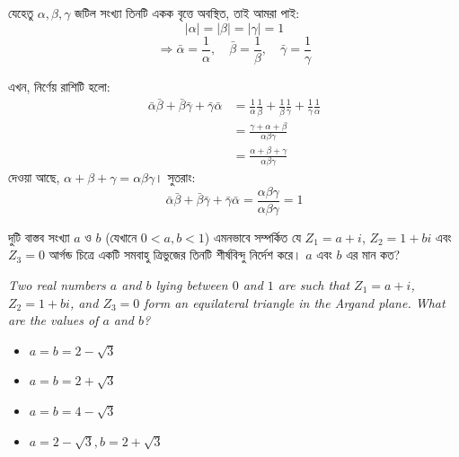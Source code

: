 \documentclass[12pt, a4paper]{article}
\begin{document}
\begin{tcolorbox}[solutionbox={সমাধান (Solution)}]
    \noindent
    যেহেতু $\alpha, \beta, \gamma$ জটিল সংখ্যা তিনটি একক বৃত্তে অবস্থিত, তাই আমরা পাই:
    \[ |\alpha| = |\beta| = |\gamma| = 1 \]
    \[ \Rightarrow \bar{\alpha} = \frac{1}{\alpha}, \quad \bar{\beta} = \frac{1}{\beta}, \quad \bar{\gamma} = \frac{1}{\gamma} \]
    
    \vspace{0.5em}
    এখন, নির্ণেয় রাশিটি হলো:
    \begin{align*}
        \bar{\alpha}\bar{\beta} + \bar{\beta}\bar{\gamma} + \bar{\gamma}\bar{\alpha} &= \frac{1}{\alpha}\frac{1}{\beta} + \frac{1}{\beta}\frac{1}{\gamma} + \frac{1}{\gamma}\frac{1}{\alpha} \\
        &= \frac{\gamma + \alpha + \beta}{\alpha\beta\gamma} \\
        &= \frac{\alpha + \beta + \gamma}{\alpha\beta\gamma}
    \end{align*}
    দেওয়া আছে, $\alpha + \beta + \gamma = \alpha\beta\gamma$। সুতরাং:
    \[ \bar{\alpha}\bar{\beta} + \bar{\beta}\bar{\gamma} + \bar{\gamma}\bar{\alpha} = \frac{\alpha\beta\gamma}{\alpha\beta\gamma} = 1 \]
\end{tcolorbox}

\begin{tcolorbox}[questionbox={প্রশ্ন (Question) 4}]
    \noindent
    দুটি বাস্তব সংখ্যা $a$ ও $b$ (যেখানে $0 < a, b < 1$) এমনভাবে সম্পর্কিত যে $Z_1 = a + i$, $Z_2 = 1 + bi$ এবং $Z_3 = 0$ আর্গন্ড চিত্রে একটি সমবাহু ত্রিভুজের তিনটি শীর্ষবিন্দু নির্দেশ করে। $a$ এবং $b$ এর মান কত?
    
    \vspace{0.8em}
    \begin{english}
    \noindent\textit{\color{darkgray}
    Two real numbers $a$ and $b$ lying between $0$ and $1$ are such that $Z_1 = a + i$, $Z_2 = 1 + bi$, and $Z_3 = 0$ form an equilateral triangle in the Argand plane. What are the values of $a$ and $b$?
    }
    \end{english}
\end{tcolorbox}

\begin{itemize}[label={}, leftmargin=1cm, itemsep=0.5em]
    \item[\textbf{A)}] $a = b = 2 - \sqrt{3}$
    \item[\textbf{B)}] $a = b = 2 + \sqrt{3}$
    \item[\textbf{C)}] $a = b = 4 - \sqrt{3}$
    \item[\textbf{D)}] $a = 2 - \sqrt{3}, b = 2 + \sqrt{3}$
\end{itemize}
\end{document}
